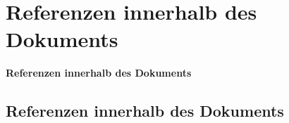 \section{Referenzen innerhalb des Dokuments}
\begin{frame}[c]
	\begin{center}
		\LARGE \textbf{Referenzen innerhalb des Dokuments}
	\end{center}
\end{frame}
\subsection*{Referenzen innerhalb des Dokuments}
